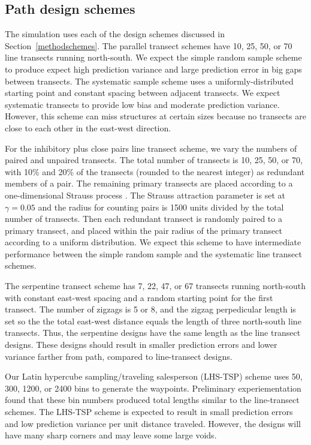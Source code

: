 \documentclass[review]{elsarticle}
\begin{document}
\subsection{Path design schemes}

The simulation uses each of the design schemes discussed in
Section~\ref{methodschemes}. The parallel transect schemes have 10,
25, 50, or 70 line transects running north-south. We expect the
simple random sample scheme to produce expect high prediction variance and
large prediction error in big gaps between transects. The systematic sample
scheme uses a uniformly-distributed starting point and constant spacing between
adjacent transects. We expect systematic transects to provide low bias and
moderate prediction variance. However, this scheme can miss structures at
certain sizes because no transects are close to each other in the east-west
direction.

For the inhibitory plus close pairs line transect scheme, we vary the numbers of
paired and unpaired transects. The total number of transects is 10, 25, 50, or
70, with 10\% and 20\% of the transects (rounded to the nearest integer) as
redundant members of a pair. The remaining primary transects are placed
according to a one-dimensional Strauss process \citep{strauss,kellyripley}. The
Strauss attraction parameter is set at \(\gamma = 0.05\) and the radius for
counting pairs is 1500 units divided by the total number of transects. Then
each redundant transect is randomly paired to a primary transect, and placed
within the pair radius of the primary transect according to a uniform
distribution. We expect this scheme to have intermediate performance between
the simple random sample and the systematic line transect schemes.

The serpentine transect scheme has 7, 22, 47, or 67 transects running
north-south with constant east-west spacing and a random starting point for the
first transect. The number of zigzags is 5 or 8, and the zigzag perpedicular
length is set so the the total east-west distance equals the length of three
north-south line transects. Thus, the serpentine designs have the same length
as the line transect designs. These designs should result in smaller
prediction errors and lower variance farther from path, compared to
line-transect designs.

Our Latin hypercube sampling/traveling salesperson (LHS-TSP) scheme uses 50,
300, 1200, or 2400 bins to generate the waypoints. Preliminary experiementation
found that these bin numbers produced total lengths similar to the
line-transect schemes. The LHS-TSP scheme is expected to result in small
prediction errors and low prediction variance per unit distance traveled.
However, the designs will have many sharp corners and may leave some large
voids.
\end{document}
